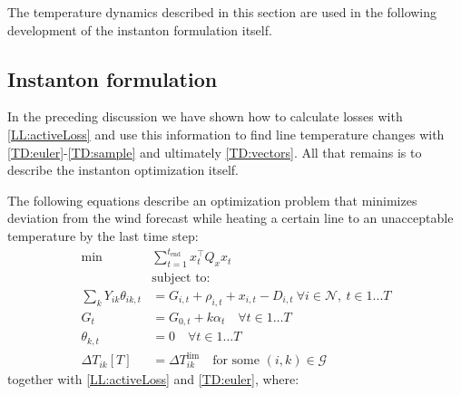 \documentclass[conference]{IEEEtran}
\begin{document}
The temperature dynamics described in this section are used in the following development of the instanton formulation itself.

\subsection{Instanton formulation}
In the preceding discussion we have shown how to calculate losses with \eqref{LL:activeLoss} and use this information to find line temperature changes with \eqref{TD:euler}-\eqref{TD:sample} and ultimately \eqref{TD:vectors}. All that remains is to describe the instanton optimization itself.

The following equations describe an optimization problem that minimizes deviation from the wind forecast while heating a certain line to an unacceptable temperature by the last time step:
\begin{subequations}\label{I:all}
\begin{align}
\label{I:obj}\min & \sum_{t=1}^{t_\text{end}} x_t^\top Q_x x_t \\
\nonumber& \text{subject to:} \\
\label{I:flow} \sum_k Y_{ik} \theta_{ik,t} & = G_{i,t} + \rho_{i,t} + x_{i,t} - D_{i,t} ~ \forall i \in \mathcal{N},~t\in 1... T \\
\label{I:conv} G_t &= G_{0,t} + k\alpha_t \quad \forall t\in 1\ldots T \\
\label{I:slack} \theta_{k,t} & = 0 \quad \forall t\in 1\ldots T \\
\label{I:lim} \Delta T_{ik}[T] &= \Delta T_{ik}^\text{lim}\quad \text{for some }(i,k)\in \mathcal{G}
\end{align}
\end{subequations}
together with \eqref{LL:activeLoss} and \eqref{TD:euler}, where:
\end{document}
